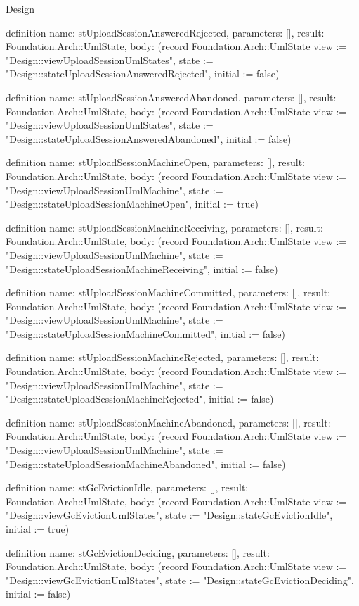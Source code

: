 \begin{lexlean}{Design}
\begin{semanticmodule}
definition{
  name: stUploadSessionAnsweredRejected,
  parameters: [],
  result: Foundation.Arch::UmlState,
  body: (record Foundation.Arch::UmlState {view := "Design::viewUploadSessionUmlStates", state := "Design::stateUploadSessionAnsweredRejected", initial := false})
}

definition{
  name: stUploadSessionAnsweredAbandoned,
  parameters: [],
  result: Foundation.Arch::UmlState,
  body: (record Foundation.Arch::UmlState {view := "Design::viewUploadSessionUmlStates", state := "Design::stateUploadSessionAnsweredAbandoned", initial := false})
}

definition{
  name: stUploadSessionMachineOpen,
  parameters: [],
  result: Foundation.Arch::UmlState,
  body: (record Foundation.Arch::UmlState {view := "Design::viewUploadSessionUmlMachine", state := "Design::stateUploadSessionMachineOpen", initial := true})
}

definition{
  name: stUploadSessionMachineReceiving,
  parameters: [],
  result: Foundation.Arch::UmlState,
  body: (record Foundation.Arch::UmlState {view := "Design::viewUploadSessionUmlMachine", state := "Design::stateUploadSessionMachineReceiving", initial := false})
}

definition{
  name: stUploadSessionMachineCommitted,
  parameters: [],
  result: Foundation.Arch::UmlState,
  body: (record Foundation.Arch::UmlState {view := "Design::viewUploadSessionUmlMachine", state := "Design::stateUploadSessionMachineCommitted", initial := false})
}

definition{
  name: stUploadSessionMachineRejected,
  parameters: [],
  result: Foundation.Arch::UmlState,
  body: (record Foundation.Arch::UmlState {view := "Design::viewUploadSessionUmlMachine", state := "Design::stateUploadSessionMachineRejected", initial := false})
}

definition{
  name: stUploadSessionMachineAbandoned,
  parameters: [],
  result: Foundation.Arch::UmlState,
  body: (record Foundation.Arch::UmlState {view := "Design::viewUploadSessionUmlMachine", state := "Design::stateUploadSessionMachineAbandoned", initial := false})
}

definition{
  name: stGcEvictionIdle,
  parameters: [],
  result: Foundation.Arch::UmlState,
  body: (record Foundation.Arch::UmlState {view := "Design::viewGcEvictionUmlStates", state := "Design::stateGcEvictionIdle", initial := true})
}

definition{
  name: stGcEvictionDeciding,
  parameters: [],
  result: Foundation.Arch::UmlState,
  body: (record Foundation.Arch::UmlState {view := "Design::viewGcEvictionUmlStates", state := "Design::stateGcEvictionDeciding", initial := false})
}


\end{semanticmodule}
\end{lexlean}
